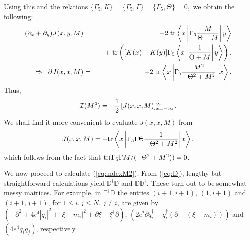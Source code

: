 \documentclass[a4paper,preprint,preprintnumbers,amsmath,amssymb]{revtex4}
\begin{document}
Using this and the relations
$
  \{ \Gamma_5, K \} = \{ \Gamma_5, \Gamma \} = \{ \Gamma_5, \Theta \} 
  = 0,
    \label{eq:anticom}
$
we obtain the following:
\begin{eqnarray}
  (\partial_x + \partial_y) J(x,y,M) 
  & = & -2 \; \hbox{tr} \left\langle x \left| \Gamma_5 
             \frac{M}{\Theta + M} \right| y \right\rangle
      \nonumber \\
  & & \;\;\;\;  + \; \hbox{tr} \left( [K(x) - K(y)] \Gamma_5 
    \left\langle x \left| \frac{1}{\Theta + M} \right| y \right\rangle
                \right).
  \\
  \Rightarrow \;\;
  \partial J(x,x,M) & = & -2 \; \hbox{tr} \left\langle x \left| \Gamma_5
             \frac{M^2}{-\Theta^2 + M^2} \right| x \right\rangle.
\end{eqnarray}
%
Thus,
\begin{equation}
   {\cal I}(M^2) 
   = - \frac{1}{2} \left[ J(x,x,M) \right]_{x= -\infty}^{\infty}.
      \label{eq:indexM2}
\end{equation}
We shall find it more convenient to evaluate $J(x,x,M)$ from
\begin{equation}
   J(x,x,M)  =  - \hbox{tr} \left\langle x \left| 
             \Gamma_5 \Gamma \Theta \frac{1}{-\Theta^2 + M^2}
       	       	       	   \right| x \right\rangle,
      \label{eq:Jalt}
\end{equation}
which follows from the fact that 
$ \hbox{tr} (\Gamma_5\Gamma M / (-\Theta^2 + M^2)) = 0 $.

We now proceed to calculate (\ref{eq:indexM2}).
From (\ref{eq:D}), lengthy but straightforward calculations yield 
$ \mathbb{D}^\dagger \mathbb{D}$ and
$ \mathbb{D} \mathbb{D}^\dagger$. These turn out to be somewhat messy
matrices. For example, in $ \mathbb{D}^\dagger \mathbb{D}$ the entries
$(i+1, i+1)$, $(1,i+1)$ and $(i+1,j+1)$, for $1 \leq i,j \leq N$, $j \neq i$, 
are given by 
$ (-\partial^2 + 4e^4 |q_i|^2 + |\xi-m_i|^2 
         + \partial\xi - \xi^\dagger \partial)$,
$ ( 2e^2 \partial q_i^\dagger - q_i^\dagger (\partial - (\xi-m_i)) )$
and
$( 4e^4 q_i q_j^\dagger )$, respectively.
\end{document}
